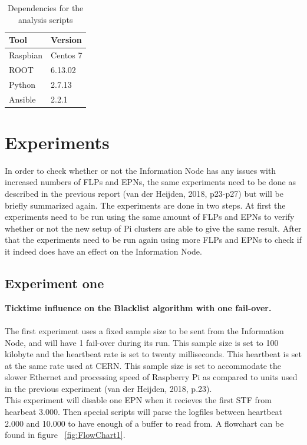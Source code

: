 \begin{table}[ht]
\begin{tabular}{| l | l |}
\hline
Tool & Version \\ \hline
Raspbian & Centos 7 \\ \hline
ROOT & 6.13.02 \\ \hline
Python & 2.7.13 \\ \hline
Ansible & 2.2.1 \\ \hline
\end{tabular}
\caption{Dependencies for the analysis scripts}
\label{table:AnalysisDependencies}
\end{table}

\newpage

\section{Experiments}
In order to check whether or not the Information Node has any issues with increased numbers of FLPs and EPNs, the same experiments need to be done as described in the previous report (van der Heijden, 2018, p23-p27) but will be briefly summarized again. The experiments are done in two steps. At first the experiments need to be run using the same amount of FLPs and EPNs to verify whether or not the new setup of Pi clusters are able to give the same result. After that the experiments need to be run again using more FLPs and EPNs to check if it indeed does have an effect on the Information Node.

\subsection{Experiment one}
\textbf{Ticktime influence on the Blacklist algorithm with one fail-over.}
\\~\\
The first experiment uses a fixed sample size to be sent from the Information Node, and will have 1 fail-over during its run. This sample size is set to 100 kilobyte and the heartbeat rate is set to twenty milliseconds. This heartbeat is set at the same rate used at CERN. This sample size is set to accommodate the slower Ethernet and processing speed of Raspberry Pi as compared to units used in the previous experiment (van der Heijden, 2018, p.23). \\
This experiment will disable one EPN when it recieves the first STF from hearbeat 3.000. Then special scripts will parse the logfiles between heartbeat 2.000 and 10.000 to have enough of a buffer to read from. A flowchart can be found in figure ~\ref{fig:FlowChart1}.

